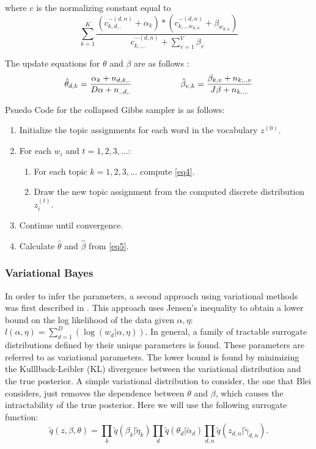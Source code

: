 \documentclass[3p,times]{elsarticle}
\begin{document}
\noindent where $c$ is the normalizing constant equal to 
$$
\sum_{k=1}^{K}{\frac{(c^{-(d,n)}_{k,d,.}+\alpha_{k})*(c^{-(d,n)}_{k,.,w_{d,n}}+\beta_{w_{d,n}})}{c^{-(d,n)}_{k,.,.}+\sum_{v=1}^{V}{\beta_{v}}}} 
$$

\noindent The update equations for $\theta$ and $\beta$ are as follows \cite{multinom}: 
\begin{equation} \label{eq5}
\hat{\theta}_{d,k}=\frac{\alpha_{k}+n_{d,k,.}}{D\alpha+n_{.,d,.}} \hspace{20mm} \hat{\beta}_{v,k}=\frac{\beta_{k,v}+n_{k,.,v}}{J\beta+n_{k,.,.}}
\end{equation}

Psuedo Code for the collapsed Gibbs sampler is as follows:
\begin{enumerate}
	\item Initialize the topic assignments for each word in the vocabulary $z^{(0)}$.
	\item For each $w_{i}$ and $t=1,2,3,...$: 
	\begin{enumerate}
		\item For each topic $k=1,2,3,...$ compute \ref{eq4}.
		\item Draw the new topic assignment from the computed discrete distribution $z^{(t)}_{i}$.
	\end{enumerate}
	\item Continue until convergence.
	\item Calculate $\hat{\theta}$ and $\hat{\beta}$ from \ref{eq5}.
\end{enumerate}

\subsubsection{Variational Bayes}
\noindent In order to infer the parameters, a second approach using variational methods was first described in \cite{lda}. This approach uses Jensen's inequality to obtain a lower bound on the log likelihood of the data given $\alpha, \eta$: $l(\alpha, \eta)=\sum_{d=1}^{D}{(\log{(w_{d} | \alpha, \eta)})}$. In general, a family of tractable surrogate distributions defined by their unique parameters is found. These parameters are referred to as variational parameters. The lower bound is found by minimizing the Kulllback-Leibler (KL) divergence between the variational distribution and the true posterior. A simple variational distribution to consider, the one that Blei considers, just removes the dependence between $\theta$ and $\beta$, which causes the intractability of the true posterior. Here we will use the following surrogate function:
$$
\tilde{q}(z, \beta, \theta)=\prod_{k}{\tilde{q}(\beta_{k} | \tilde{\eta}_{k})}\prod_{d}{\tilde{q}(\theta_{d} | \tilde{\alpha}_{d})} \prod_{d,n}{\tilde{q}(z_{d,n} | \tilde{\gamma}_{d,n})}.
$$
\end{document}

